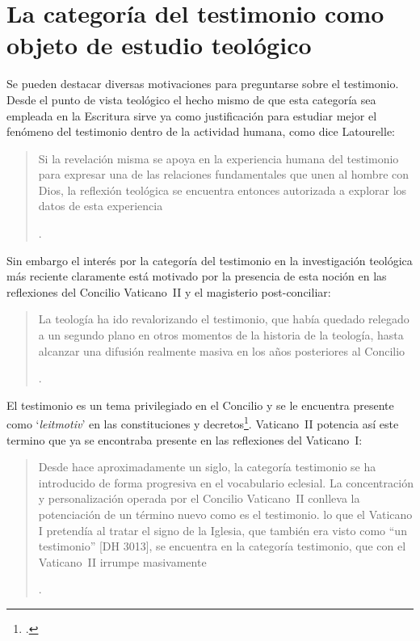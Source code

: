 \section{La categoría del testimonio como objeto de estudio teológico}

Se pueden destacar diversas motivaciones para preguntarse sobre el testimonio. Desde el punto de vista teológico el hecho mismo de que esta categoría sea empleada en la Escritura sirve ya como justificación para estudiar mejor el fenómeno del testimonio dentro de la actividad humana, como dice Latourelle: \blockquote[{\Cite[1523]{latourelle2000testimonio}}.]{Si la revelación misma se apoya en la experiencia humana del testimonio para expresar una de las relaciones fundamentales que unen al hombre con Dios, la reflexión teológica se encuentra entonces autorizada a explorar los datos de esta experiencia}. Sin embargo el interés por la categoría del testimonio en la investigación teológica más reciente claramente está motivado por la presencia de esta noción en las reflexiones del Concilio Vaticano~II y el magisterio post-conciliar: \blockquote[{\Cite[81]{prades2015testimonio}}.]{La teología ha ido revalorizando el testimonio, que había quedado relegado a un segundo plano en otros momentos de la historia de la teología, hasta alcanzar una difusión realmente masiva en los años posteriores al Concilio}. El testimonio es un tema privilegiado en el Concilio y se le encuentra presente como `\emph{leitmotiv}' en las constituciones y decretos\footcite[Cf.][1523]{latourelle2000testimonio}. Vaticano~II potencia así este termino que ya se encontraba presente en las reflexiones del Vaticano~I: \blockquote[{\Cite[572]{ninot2009tf}}.]{Desde hace aproximadamente un siglo, la categoría testimonio se ha introducido de forma progresiva en el vocabulario eclesial. La concentración y personalización operada por el Concilio Vaticano~II conlleva la potenciación de un término nuevo como es el testimonio. \textelp{} lo que el Vaticano I pretendía al tratar el signo de la Iglesia, que también era visto como ``un testimonio'' [DH 3013], se encuentra en la categoría testimonio, que con el Vaticano~II irrumpe masivamente}.

